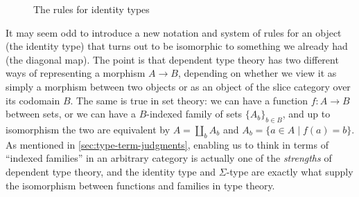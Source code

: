 \documentclass[10pt]{article}
\let\jdeq\equiv
\def\ty{\;\mathsf{type}}
\def\refl{\mathsf{refl}}
\def\J{\mathsf{J}}
\def\types{\vdash}
\def\equiv{\mathsf{Equiv}}
\numberwithin{equation}{section}
\begin{document}
\begin{figure}
  \centering
\caption{The rules for identity types}
\label{fig:id}
\end{figure}

It may seem odd to introduce a new notation and system of rules for an object (the identity type) that turns out to be isomorphic to something we already had (the diagonal map).
The point is that dependent type theory has two different ways of representing a morphism $A\to B$, depending on whether we view it as simply a morphism between two objects or as an object of the slice category over its codomain $B$.
The same is true in set theory: we can have a function $f:A\to B$ between sets, or we can have a $B$-indexed family of sets $\{A_b\}_{b\in B}$, and up to isomorphism the two are equivalent by $A= \coprod_b A_b$ and $A_b = \{ a\in A \mid f(a)=b \}$.
As mentioned in \cref{sec:type-term-judgments}, enabling us to think in terms of ``indexed families'' in an arbitrary category is actually one of the \emph{strengths} of dependent type theory, and
the identity type and $\Sigma$-type are exactly what supply the isomorphism between functions and families in type theory. %
\end{document}
